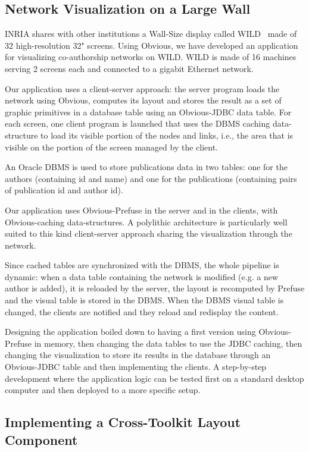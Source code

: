 \subsection{Network Visualization on a Large Wall}

INRIA shares with other institutions a Wall-Size display called
WILD~\cite{Wild} made of 32 high-resolution 32" screens.  Using
Obvious, we have developed an application for visualizing
co-authorship networks on WILD.  WILD is made of 16 machines serving 2
screens each and connected to a gigabit Ethernet network.

Our application uses a client-server approach: the server program
loads the network using Obvious, computes its layout and stores the
result as a set of graphic primitives in a database table using an
Obvious-JDBC data table.  For each screen, one client program is
launched that uses the DBMS caching data-structure to load its visible
portion of the nodes and links, i.e., the area that is visible on the
portion of the screen managed by the client.

An Oracle DBMS is used to store publications data in two tables: one
for the authors (containing id and name) and one for the publications
(containing pairs of publication id and author id).

Our application uses Obvious-Prefuse in the server and in the clients,
with Obvious-caching data-structures.  A polylithic architecture is
particularly well suited to this kind client-server approach sharing
the visualization through the network.

Since cached tables are synchronized with the DBMS, the whole pipeline
is dynamic: when a data table containing the network is modified
(e.g. a new author is added), it is reloaded by the server, the layout
is recomputed by Prefuse and the visual table is stored in the DBMS.
When the DBMS visual table is changed, the clients are notified and
they reload and redisplay the content.

Designing the application boiled down to having a first version using
Obvious-Prefuse in memory, then changing the data tables to use the
JDBC caching, then changing the visualization to store its results in
the database through an Obvious-JDBC table and then implementing the
clients.  A step-by-step development where the application logic can
be tested first on a standard desktop computer and then deployed to a
more specific setup.

\subsection{Implementing a Cross-Toolkit Layout Component}

